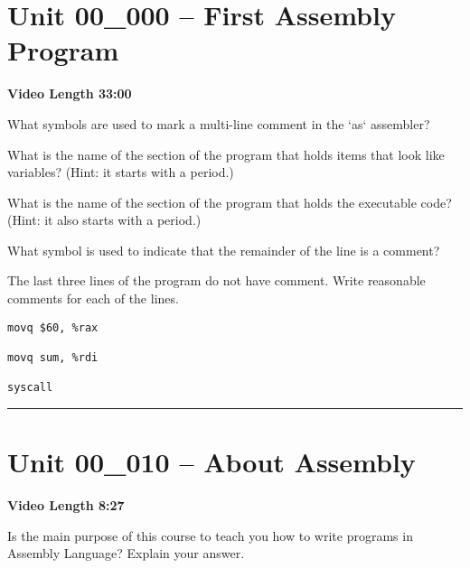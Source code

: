 \documentclass[letterpaper,12pt]{exam}
\newcommand{\unit}{Unit 00}
\begin{document}
\section*{\unit\_000 -- First Assembly Program} 
\par{\selectfont\textbf{Video Length 33:00}}
\begin{questions}

\begin{samepage}
    \question What symbols are used to mark a multi-line comment in the `as` assembler?
    \vspace{5mm}
\end{samepage}

\begin{samepage}
    \question What is the name of the section of the program that holds items that look like variables?  (Hint: it starts with a period.)
    \vspace{5mm}
\end{samepage}

\begin{samepage}
    \question What is the name of the section of the program that holds the executable code? (Hint: it also starts with a period.)
    \vspace{5mm}
\end{samepage}

\begin{samepage}
    \question What symbol is used to indicate that the remainder of the line is a comment?
    \vspace{5mm}

\begin{samepage}
    \question The last three lines of the program do not have comment.  Write reasonable comments for each of the lines.
    \begin{Large}
    \begin{verbatim}
movq $60, %rax

movq sum, %rdi
      
syscall
    \end{verbatim}
    \end{Large}
    \vspace{5mm}
\end{samepage}
\end{samepage}
\hrule %

\section*{\unit\_010 -- About Assembly}
\par{\selectfont\textbf{Video Length 8:27}}
\begin{samepage}
    \question  Is the main purpose of this course to teach you how to write programs in Assembly Language?  Explain your answer.
    \vspace{25mm}
\end{samepage}


\end{questions}
\end{document}

